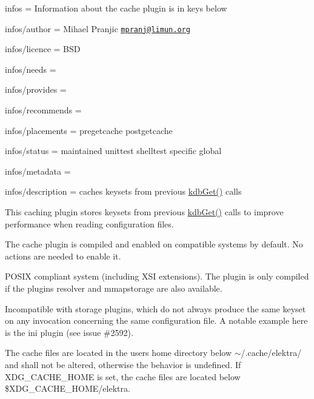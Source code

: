 
\begin{DoxyItemize}
\item infos = Information about the cache plugin is in keys below
\item infos/author = Mihael Pranjic \href{mailto:mpranj@limun.org}{\tt mpranj@limun.\+org}
\item infos/licence = B\+SD
\item infos/needs =
\item infos/provides =
\item infos/recommends =
\item infos/placements = pregetcache postgetcache
\item infos/status = maintained unittest shelltest specific global
\item infos/metadata =
\item infos/description = caches keysets from previous {\ttfamily \hyperlink{group__kdb_ga28e385fd9cb7ccfe0b2f1ed2f62453a1}{kdb\+Get()}} calls
\end{DoxyItemize}

This caching plugin stores keysets from previous {\ttfamily \hyperlink{group__kdb_ga28e385fd9cb7ccfe0b2f1ed2f62453a1}{kdb\+Get()}} calls to improve performance when reading configuration files.

The cache plugin is compiled and enabled on compatible systems by default. No actions are needed to enable it.

P\+O\+S\+IX compliant system (including X\+SI extensions). The plugin is only compiled if the plugins {\ttfamily resolver} and {\ttfamily mmapstorage} are also available.

Incompatible with storage plugins, which do not always produce the same keyset on any invocation concerning the same configuration file. A notable example here is the {\ttfamily ini} plugin (see issue \#2592).

The cache files are located in the user\textquotesingle{}s home directory below {\ttfamily $\sim$/.cache/elektra/} and shall not be altered, otherwise the behavior is undefined. If {\ttfamily X\+D\+G\+\_\+\+C\+A\+C\+H\+E\+\_\+\+H\+O\+ME} is set, the cache files are located below {\ttfamily \$\+X\+D\+G\+\_\+\+C\+A\+C\+H\+E\+\_\+\+H\+O\+ME/elektra}. 